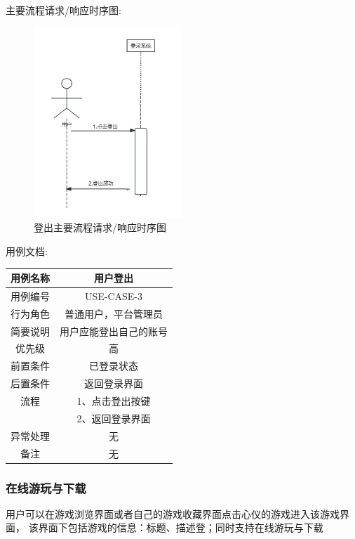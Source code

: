 \documentclass[12pt]{ctexart} %
\begin{document}
主要流程请求/响应时序图:
\begin{figure}[ht]
  \centering
  \includegraphics[width=0.5\textwidth]{yongli3.jpg}
  \caption{登出主要流程请求/响应时序图}
  \label{fig:logout-sequence} %
\end{figure}
用例文档:

\begin{tabular}{|c|c|}
  \hline
  用例名称& 用户登出\\
  \hline
  用例编号 & USE-CASE-3\\
  \hline
  行为角色 & 普通用户，平台管理员\\
  \hline
  简要说明 & 用户应能登出自己的账号\\
  \hline
  优先级 & 高\\
  \hline
  前置条件 & 已登录状态\\
  \hline
  后置条件 & 返回登录界面\\
  \hline
  流程 & 1、点击登出按键\\
      & 2、返回登录界面\\
  \hline
  异常处理 & 无\\
  \hline
  备注 & 无\\
  \hline
\end{tabular}

\subsubsection{在线游玩与下载}
用户可以在游戏浏览界面或者自己的游戏收藏界面点击心仪的游戏进入该游戏界面，
该界面下包括游戏的信息：标题、描述登；同时支持在线游玩与下载
\end{document}
